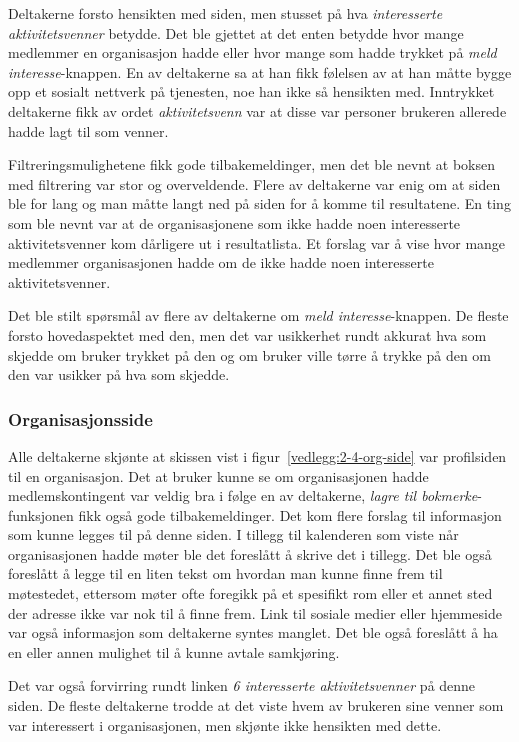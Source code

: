 Deltakerne forsto hensikten med siden, men stusset på hva {\em  interesserte aktivitetsvenner} betydde. Det ble gjettet at det enten betydde hvor mange medlemmer en organisasjon hadde eller hvor mange som hadde trykket på {\em  meld interesse}-knappen. En av deltakerne sa at han fikk følelsen av at han måtte bygge opp et sosialt nettverk på tjenesten, noe han ikke så hensikten med. Inntrykket deltakerne fikk av ordet {\em  aktivitetsvenn} var at disse var personer brukeren allerede hadde lagt til som venner.

Filtreringsmulighetene fikk gode tilbakemeldinger, men det ble nevnt at boksen med filtrering var stor og overveldende. Flere av deltakerne var enig om at siden ble for lang og man måtte langt ned på siden for å komme til resultatene. En ting som ble nevnt var at de organisasjonene som ikke hadde noen interesserte aktivitetsvenner kom dårligere ut i resultatlista. Et forslag var å vise hvor mange medlemmer organisasjonen hadde om de ikke hadde noen interesserte aktivitetsvenner.

Det ble stilt spørsmål av flere av deltakerne om {\em  meld interesse}-knappen. De fleste forsto hovedaspektet med den, men det var usikkerhet rundt akkurat hva som skjedde om bruker trykket på den og om bruker ville tørre å trykke på den om den var usikker på hva som skjedde.


\subsubsection{Organisasjonsside}

Alle deltakerne skjønte at skissen vist i figur~\ref{vedlegg:2-4-org-side} var profilsiden til en organisasjon. Det at bruker kunne se om organisasjonen hadde medlemskontingent var veldig bra i følge en av deltakerne, {\em  lagre til bokmerke}-funksjonen fikk også gode tilbakemeldinger. Det kom flere forslag til informasjon som kunne legges til på denne siden. I tillegg til kalenderen som viste når organisasjonen hadde møter ble det foreslått å skrive det i tillegg. Det ble også foreslått å legge til en liten tekst om hvordan man kunne finne frem til møtestedet, ettersom møter ofte foregikk på et spesifikt rom eller et annet sted der adresse ikke var nok til å finne frem. Link til sosiale medier eller hjemmeside var også informasjon som deltakerne syntes manglet. Det ble også foreslått å ha en eller annen mulighet til å kunne avtale samkjøring.

Det var også forvirring rundt linken {\em  6 interesserte aktivitetsvenner} på denne siden. De fleste deltakerne trodde at det viste hvem av brukeren sine venner som var interessert i organisasjonen, men skjønte ikke hensikten med dette.



